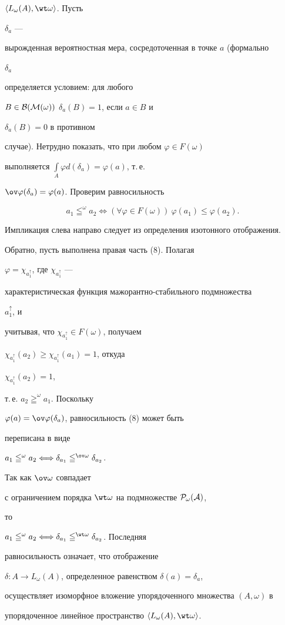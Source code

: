 \begin{pf}
$\la L_\omega(A),\wt\omega\ra$. Пусть 


$\delta_a$ --- 


вырожденная вероятностная мера, сосредоточенная в точке $a$ (формально 


$\delta_a$ 


определяется условием: для любого 


$B\in\cal B(M(\omega))$\; $\delta_a(B)=1$, если $a\in B$ и 


$\delta_a(B)=0$ в противном 


случае). Нетрудно показать, что при любом $\varphi\in F(\omega)$ 


выполняется $\int\limits_A\varphi d(\delta_a)=\varphi(a)$, т.\,е. 


$\ov\varphi(\delta_a)=\varphi(a)$. Проверим равносильность 


\begin{equation} 


a_1\leqq^\omega a_2 \Longleftrightarrow 


(\forall\varphi\in F(\omega))\ \varphi(a_1)\le\varphi(a_2). 


\end{equation} 


Импликация слева направо следует из определения изотонного отображения. 


Обратно, пусть выполнена правая часть (8). Полагая 


$\varphi=\chi_{a^\uparrow_1}$, где $\chi_{a^\uparrow_1}$ --- 


характеристическая функция мажорантно-стабильного подмножества 


$a^\uparrow_1$, и 


учитывая, что $\chi_{a^\uparrow_1}\in F(\omega)$, получаем 


$\chi_{a^\uparrow_1}(a_2)\ge\chi_{a^\uparrow_1}(a_1)=1$, откуда 


$\chi_{a^\uparrow_1}(a_2)=1$, 


т.\,е. $a_2\geqq^\omega a_1$. Поскольку 


$\varphi(a)=\ov\varphi(\delta_a)$, равносильность (8) может быть 


переписана в виде 


$a_1\leqq^\omega a_2 \Longleftrightarrow\delta_{a_1} 


\leqq^{\ov\omega}\delta_{a_2}$.


Так как $\ov\omega$ совпадает 


с ограничением порядка $\wt\omega$ на подмножестве $\cal P_\omega(A)$, 


то 


$a_1\leqq^\omega a_2\Longleftrightarrow \delta_{a_1} 


\leqq^{\wt\omega}\delta_{a_2}$. Последняя 


равносильность означает, что отображение 


$\delta:A\to L_\omega(A)$, определенное равенством $\delta(a)=\delta_a$, 


осуществляет изоморфное вложение упорядоченного множества $(A,\omega)$ в 


упорядоченное линейное пространство $\la L_\omega(A),\wt\omega\ra$. 


\end{pf} 
